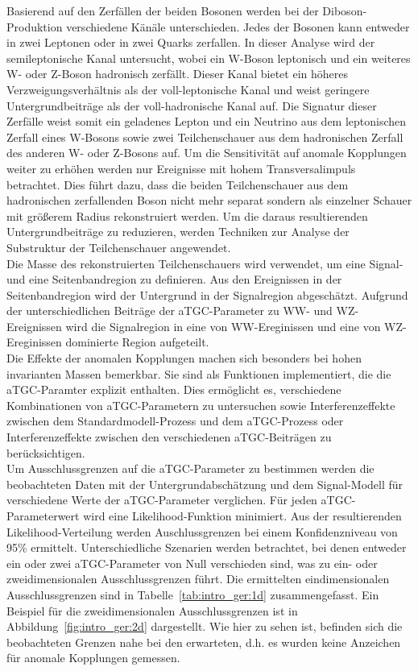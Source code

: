 Basierend auf den Zerfällen der beiden Bosonen werden bei der Diboson-Produktion verschiedene Känäle unterschieden. Jedes der Bosonen kann entweder in zwei Leptonen oder in zwei Quarks zerfallen. In dieser Analyse wird der semileptonische Kanal untersucht, wobei ein W-Boson leptonisch und ein weiteres W- oder Z-Boson hadronisch zerfällt. Dieser Kanal bietet ein höheres Verzweigungsverhältnis als der voll-leptonische Kanal und weist geringere Untergrundbeiträge als der voll-hadronische Kanal auf. Die Signatur dieser Zerfälle weist somit ein geladenes Lepton und ein Neutrino aus dem leptonischen Zerfall eines W-Bosons sowie zwei Teilchenschauer aus dem hadronischen Zerfall des anderen W- oder Z-Bosons auf. Um die Sensitivität auf anomale Kopplungen weiter zu erhöhen werden nur Ereignisse mit hohem Transversalimpuls betrachtet. Dies führt dazu, dass die beiden Teilchenschauer aus dem hadronischen zerfallenden Boson nicht mehr separat sondern als einzelner Schauer mit größerem Radius rekonstruiert werden. Um die daraus resultierenden Untergrundbeiträge zu reduzieren, werden Techniken zur Analyse der Substruktur der Teilchenschauer angewendet.\\

Die Masse des rekonstruierten Teilchenschauers wird verwendet, um eine Signal- und eine Seitenbandregion zu  definieren. Aus den Ereignissen in der Seitenbandregion wird der Untergrund in der Signalregion abgeschätzt. Aufgrund der unterschiedlichen Beiträge der aTGC-Parameter zu WW- und WZ-Ereignissen wird die Signalregion in eine von WW-Ereginissen und eine von WZ-Ereginissen dominierte Region aufgeteilt. \\

Die Effekte der anomalen Kopplungen machen sich besonders bei hohen invarianten Massen bemerkbar. Sie sind als Funktionen implementiert, die die aTGC-Paramter explizit enthalten. Dies ermöglicht es, verschiedene Kombinationen von aTGC-Parametern zu untersuchen sowie Interferenzeffekte zwischen dem Standardmodell-Prozess und dem aTGC-Prozess oder Interferenzeffekte zwischen den verschiedenen aTGC-Beiträgen zu berücksichtigen.\\

Um Ausschlussgrenzen auf die aTGC-Parameter zu bestimmen werden die beobachteten Daten mit der Untergrundabschätzung und dem Signal-Modell für verschiedene Werte der aTGC-Parameter verglichen. Für jeden aTGC-Parameterwert wird eine Likelihood-Funktion minimiert. Aus der resultierenden Likelihood-Verteilung werden Auschlussgrenzen bei einem Konfidenzniveau von 95\% ermittelt. Unterschiedliche Szenarien werden betrachtet, bei denen entweder ein oder zwei aTGC-Parameter von Null verschieden sind, was zu ein- oder zweidimensionalen Ausschlussgrenzen führt. Die ermittelten eindimensionalen Ausschlussgrenzen sind in Tabelle~\ref{tab:intro_ger:1d} zusammengefasst. Ein Beispiel für die zweidimensionalen Ausschlussgrenzen ist in Abbildung~\ref{fig:intro_ger:2d} dargestellt. Wie hier zu sehen ist, befinden sich die beobachteten Grenzen nahe bei den erwarteten, d.h. es wurden keine Anzeichen für anomale Kopplungen gemessen.\\

